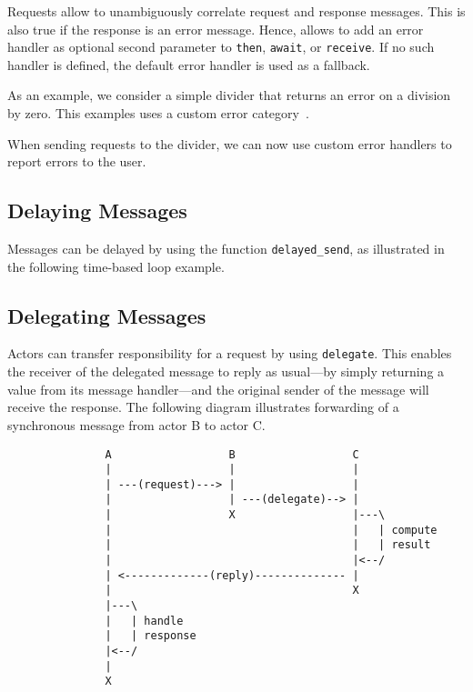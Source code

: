 Requests allow \lib to unambiguously correlate request and response messages. This is also true if the response is an error message. Hence, \lib allows to add an error handler as optional second parameter to \lstinline^then^, \lstinline^await^, or \lstinline^receive^. If no such handler is defined, the default error handler  is used as a fallback.

As an example, we consider a simple divider that returns an error on a division by zero. This examples uses a custom error category~.



\clearpage
When sending requests to the divider, we can now use custom error handlers to report errors to the user.



\subsection{Delaying Messages}

Messages can be delayed by using the function \lstinline^delayed_send^, as illustrated in the following time-based loop example. 



\clearpage
\subsection{Delegating Messages}
\label{delegate}

Actors can transfer responsibility for a request by using \lstinline^delegate^. This enables the receiver of the delegated message to reply as usual---by simply returning a value from its message handler---and the original sender of the message will receive the response. The following diagram illustrates forwarding of a synchronous message from actor B to actor C.

\begin{footnotesize}
\begin{verbatim}
               A                  B                  C
               |                  |                  |
               | ---(request)---> |                  |
               |                  | ---(delegate)--> |
               |                  X                  |---\
               |                                     |   | compute
               |                                     |   | result
               |                                     |<--/
               | <-------------(reply)-------------- |
               |                                     X
               |---\
               |   | handle
               |   | response
               |<--/
               |
               X
\end{verbatim}
\end{footnotesize}

